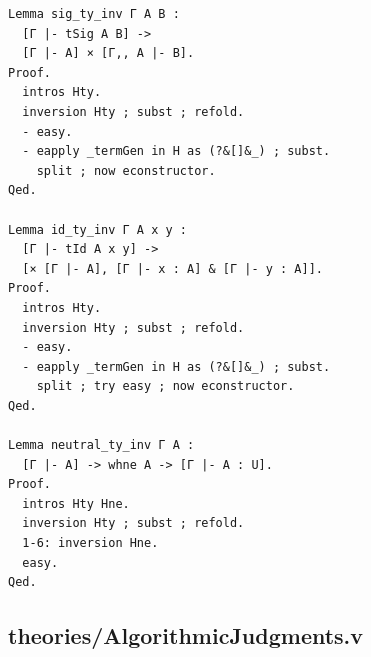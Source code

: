 \begin{lstlisting}
Lemma sig_ty_inv Γ A B :
  [Γ |- tSig A B] ->
  [Γ |- A] × [Γ,, A |- B].
Proof.
  intros Hty.
  inversion Hty ; subst ; refold.
  - easy.
  - eapply _termGen in H as (?&[]&_) ; subst.
    split ; now econstructor.
Qed.

Lemma id_ty_inv Γ A x y :
  [Γ |- tId A x y] ->
  [× [Γ |- A], [Γ |- x : A] & [Γ |- y : A]].
Proof.
  intros Hty.
  inversion Hty ; subst ; refold.
  - easy.
  - eapply _termGen in H as (?&[]&_) ; subst.
    split ; try easy ; now econstructor.
Qed.

Lemma neutral_ty_inv Γ A :
  [Γ |- A] -> whne A -> [Γ |- A : U].
Proof.
  intros Hty Hne.
  inversion Hty ; subst ; refold.
  1-6: inversion Hne.
  easy.
Qed.
\end{lstlisting}

\subsection*{theories/AlgorithmicJudgments.v}
